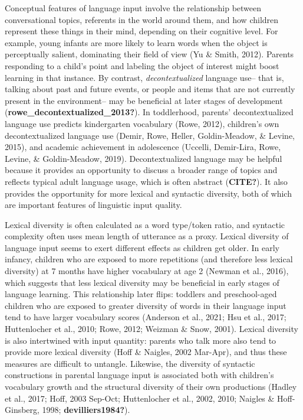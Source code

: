 \documentclass[
  man]{apa6}
\begin{document}
Conceptual features of language input involve the relationship between conversational topics, referents in the world around them, and how children represent these things in their mind, depending on their cognitive level. For example, young infants are more likely to learn words when the object is perceptually salient, dominating their field of view (Yu \& Smith, 2012). Parents responding to a child's point and labeling the object of interest might boost learning in that instance. By contrast, \emph{decontextualized} language use-- that is, talking about past and future events, or people and items that are not currently present in the environment-- may be beneficial at later stages of development (\textbf{rowe\_decontextualized\_2013?}). In toddlerhood, parents' decontextualized language use predicts kindergarten vocabulary (Rowe, 2012), children's own decontextualized language use (Demir, Rowe, Heller, Goldin-Meadow, \& Levine, 2015), and academic achievement in adolescence (Uccelli, Demir-Lira, Rowe, Levine, \& Goldin-Meadow, 2019). Decontextualized language may be helpful because it provides an opportunity to discuss a broader range of topics and reflects typical adult language usage, which is often abstract (\textbf{CITE?}). It also provides the opportunity for more lexical and syntactic diversity, both of which are important features of linguistic input quality.

Lexical diversity is often calculated as a word type/token ratio, and syntactic complexity often uses mean length of utterance as a proxy. Lexical diversity of language input seems to exert different effects as children get older. In early infancy, children who are exposed to more repetitions (and therefore less lexical diversity) at 7 months have higher vocabulary at age 2 (Newman et al., 2016), which suggests that less lexical diversity may be beneficial in early stages of language learning. This relationship later flips: toddlers and preschool-aged children who are exposed to greater diversity of words in their language input tend to have larger vocabulary scores (Anderson et al., 2021; Hsu et al., 2017; Huttenlocher et al., 2010; Rowe, 2012; Weizman \& Snow, 2001). Lexical diversity is also intertwined with input quantity: parents who talk more also tend to provide more lexical diversity (Hoff \& Naigles, 2002 Mar-Apr), and thus these measures are difficult to untangle. Likewise, the diversity of syntactic constructions in parental language input is associated both with children's vocabulary growth and the structural diversity of their own productions (Hadley et al., 2017; Hoff, 2003 Sep-Oct; Huttenlocher et al., 2002, 2010; Naigles \& Hoff-Ginsberg, 1998; \textbf{devilliers1984?}).
\end{document}
